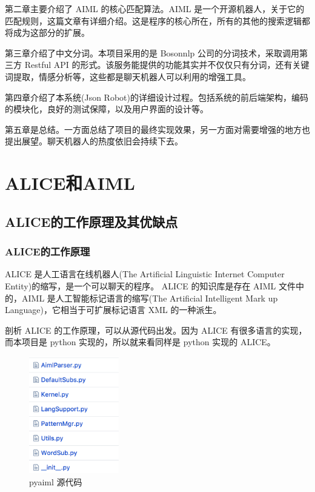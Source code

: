 \documentclass[bachelor,winfonts]{jnuthesis}
\begin{document}
第二章主要介绍了 AIML 的核心匹配算法。AIML 是一个开源机器人，关于它的匹配规则，这篇文章有详细介绍\cite{aiml-match-pattern}。这是程序的核心所在，所有的其他的搜索逻辑都将成为这部分的扩展。

第三章介绍了中文分词。本项目采用的是 Bosonnlp 公司的分词技术，采取调用第三方 Restful API 的形式。该服务能提供的功能其实并不仅仅只有分词，还有关键词提取，情感分析等，这些都是聊天机器人可以利用的增强工具。

第四章介绍了本系统(Json Robot)的详细设计过程。包括系统的前后端架构，编码的模块化，良好的测试保障，以及用户界面的设计等。

第五章是总结。一方面总结了项目的最终实现效果，另一方面对需要增强的地方也提出展望。聊天机器人的热度依旧会持续下去。


\chapter{ALICE和AIML}
\section{ALICE的工作原理及其优缺点}
\subsection{ALICE的工作原理}
ALICE 是人工语言在线机器人(The Artificial Linguistic Internet Computer Entity)的缩写，是一个可以聊天的程序。 ALICE 的知识库是存在 AIML 文件中的，AIML 是人工智能标记语言的缩写(The Artificial Intelligent Mark up Language)，它相当于可扩展标记语言 XML 的一种派生。

剖析 ALICE 的工作原理，可以从源代码出发。因为 ALICE 有很多语言的实现，而本项目是 python 实现的，所以就来看同样是 python 实现\cite{github-pyaiml}的 ALICE。

\begin{figure}[htbp]
  \centering
  \includegraphics[width= 0.35\textwidth, height=0.45\textwidth]{pyaiml-project.png}
  \caption{pyaiml 源代码}\label{fig:pic2}
\end{figure}
\end{document}
